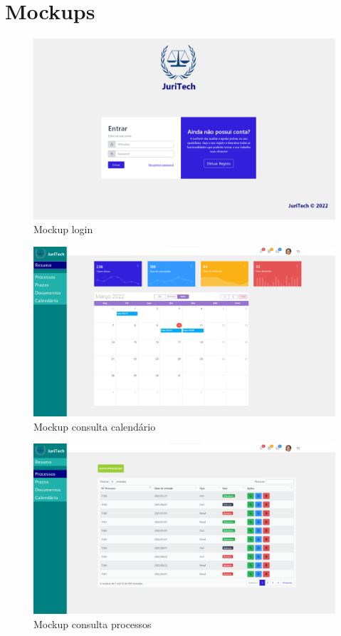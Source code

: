 \section{Mockups}

\begin{figure}[!h]
\centering
\includegraphics[width=1\textwidth]{Figuras/login.png}
\caption{Mockup login}
\label{d.cdu}
\end{figure}

\begin{figure}[!h]
\centering
\includegraphics[width=1\textwidth]{Figuras/calendário.png}
\caption{Mockup consulta calendário}
\label{d.componentes}
\end{figure}

\begin{figure}[!h]
\centering
\includegraphics[width=1\textwidth]{Figuras/consultar_processo.png}
\caption{Mockup consulta processos}
\label{d.classes}
\end{figure}

